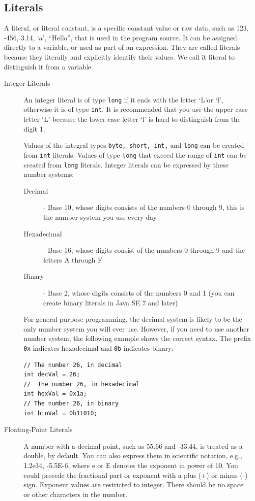 \documentclass[11pt,a4paper]{article}
\begin{document}
\subsection*{Literals}
A literal, or literal constant, is a specific constant value or raw data, such as 123, -456, 3.14, `a', ``Hello'', that is used in the program source. It can be assigned directly to a variable, or used as part of an expression. They are called literals because they literally and explicitly identify their values. We call it literal to distinguish it from a variable.
\begin{description}
\item [Integer Literals]
An integer literal is of type \lstinline!long! if it ends with the letter `L'or `l', otherwise it is of type \lstinline!int!. It is recommended that you use the upper case letter `L' because the lower case letter `l' is hard to distinguish from the digit 1.

Values of the integral types \lstinline!byte, short, int,! and \lstinline!long! can be created from \lstinline!int! literals. Values of type \lstinline!long! that exceed the range of \lstinline!int! can be created from \lstinline!long! literals. Integer literals can be expressed by these number systems:
\begin{description}
\item [Decimal] - Base 10, whose digits consists of the numbers 0 through 9, this is the number system you use every day
\item [Hexadecimal] - Base 16, whose digits consist of the numbers 0 through 9 and the letters A through F
\item [Binary] - Base 2, whose digits consists of the numbers 0 and 1 (you can create binary literals in Java SE 7 and later)
\end{description}
For general-purpose programming, the decimal system is likely to be the only number system you will ever use. However, if you need to use another number system, the following example shows the correct syntax. The prefix \texttt{0x} indicates hexadecimal and \texttt{0b} indicates binary:
\begin{lstlisting}[numbers=none]
// The number 26, in decimal
int decVal = 26;
//  The number 26, in hexadecimal
int hexVal = 0x1a;
// The number 26, in binary
int binVal = 0b11010;
\end{lstlisting}
\item [Floating-Point Literals]
A number with a decimal point, such as 55.66 and -33.44, is treated as a double, by default. You can also express them in scientific notation, e.g., 1.2e34, -5.5E-6, where e or E denotes the exponent in power of 10. You could precede the fractional part or exponent with a plus (+) or minus (-) sign. Exponent values are restricted to integer. There should be no space or other characters in the number.


\end{description}
\end{document}
